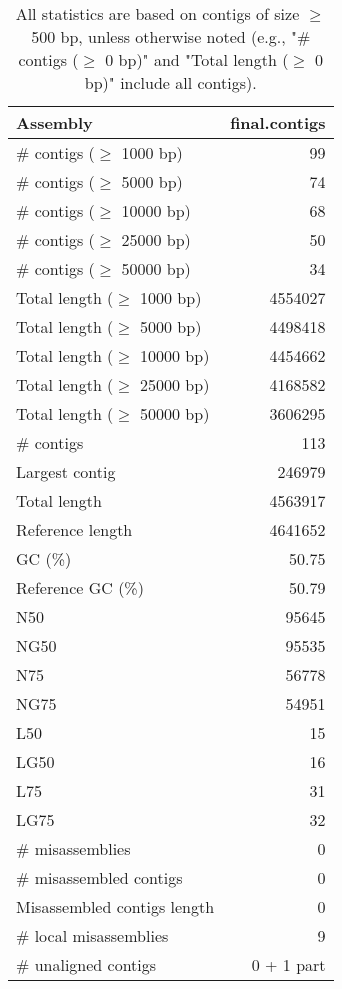 \documentclass[12pt,a4paper]{article}
\begin{document}
\begin{table}[ht]
\begin{center}
\caption{All statistics are based on contigs of size $\geq$ 500 bp, unless otherwise noted (e.g., "\# contigs ($\geq$ 0 bp)" and "Total length ($\geq$ 0 bp)" include all contigs).}
\begin{tabular}{|l*{1}{|r}|}
\hline
Assembly & final.contigs \\ \hline
\# contigs ($\geq$ 1000 bp) & 99 \\ \hline
\# contigs ($\geq$ 5000 bp) & 74 \\ \hline
\# contigs ($\geq$ 10000 bp) & 68 \\ \hline
\# contigs ($\geq$ 25000 bp) & 50 \\ \hline
\# contigs ($\geq$ 50000 bp) & 34 \\ \hline
Total length ($\geq$ 1000 bp) & 4554027 \\ \hline
Total length ($\geq$ 5000 bp) & 4498418 \\ \hline
Total length ($\geq$ 10000 bp) & 4454662 \\ \hline
Total length ($\geq$ 25000 bp) & 4168582 \\ \hline
Total length ($\geq$ 50000 bp) & 3606295 \\ \hline
\# contigs & 113 \\ \hline
Largest contig & 246979 \\ \hline
Total length & 4563917 \\ \hline
Reference length & 4641652 \\ \hline
GC (\%) & 50.75 \\ \hline
Reference GC (\%) & 50.79 \\ \hline
N50 & 95645 \\ \hline
NG50 & 95535 \\ \hline
N75 & 56778 \\ \hline
NG75 & 54951 \\ \hline
L50 & 15 \\ \hline
LG50 & 16 \\ \hline
L75 & 31 \\ \hline
LG75 & 32 \\ \hline
\# misassemblies & 0 \\ \hline
\# misassembled contigs & 0 \\ \hline
Misassembled contigs length & 0 \\ \hline
\# local misassemblies & 9 \\ \hline
\# unaligned contigs & 0 + 1 part \\ \hline

\end{tabular}
\end{center}
\end{table}
\end{document}
